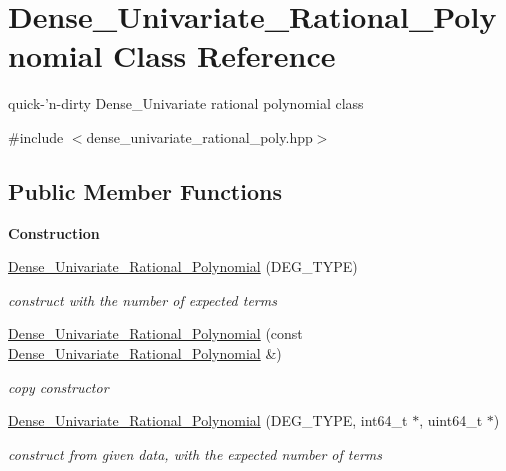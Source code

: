 \hypertarget{class_dense___univariate___rational___polynomial}{}\section{Dense\+\_\+\+Univariate\+\_\+\+Rational\+\_\+\+Polynomial Class Reference}
\label{class_dense___univariate___rational___polynomial}


quick-\/'n-\/dirty Dense\+\_\+\+Univariate rational polynomial class  




{\ttfamily \#include $<$dense\+\_\+univariate\+\_\+rational\+\_\+poly.\+hpp$>$}

\subsection*{Public Member Functions}
\begin{Indent}\textbf{ Construction}\par
\begin{DoxyCompactItemize}
\item 
\mbox{\label{class_dense___univariate___rational___polynomial_a373bccc0cf3c06160702a484edb5ca10}} 
\hyperlink{class_dense___univariate___rational___polynomial_a373bccc0cf3c06160702a484edb5ca10}{Dense\+\_\+\+Univariate\+\_\+\+Rational\+\_\+\+Polynomial} (D\+E\+G\+\_\+\+T\+Y\+PE)
\begin{DoxyCompactList}\small\item\em construct with the number of expected terms \end{DoxyCompactList}\item 
\mbox{\label{class_dense___univariate___rational___polynomial_a809d897a0cc6a226c42b80617c2aeab5}} 
\hyperlink{class_dense___univariate___rational___polynomial_a809d897a0cc6a226c42b80617c2aeab5}{Dense\+\_\+\+Univariate\+\_\+\+Rational\+\_\+\+Polynomial} (const \hyperlink{class_dense___univariate___rational___polynomial}{Dense\+\_\+\+Univariate\+\_\+\+Rational\+\_\+\+Polynomial} \&)
\begin{DoxyCompactList}\small\item\em copy constructor \end{DoxyCompactList}\item 
\mbox{\label{class_dense___univariate___rational___polynomial_a355c74bb36083fa2407a28ac066ca081}} 
\hyperlink{class_dense___univariate___rational___polynomial_a355c74bb36083fa2407a28ac066ca081}{Dense\+\_\+\+Univariate\+\_\+\+Rational\+\_\+\+Polynomial} (D\+E\+G\+\_\+\+T\+Y\+PE, int64\+\_\+t $\ast$, uint64\+\_\+t $\ast$)
\begin{DoxyCompactList}\small\item\em construct from given data, with the expected number of terms \end{DoxyCompactList}\end{DoxyCompactItemize}
\end{Indent}

